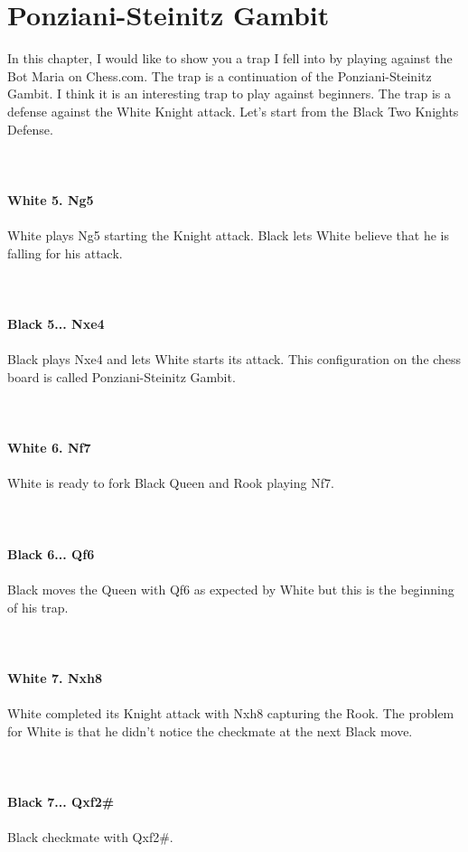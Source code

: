 \documentclass{article}
\begin{document}
\section{ Ponziani-Steinitz Gambit}

In this chapter, I would like to show you a trap I fell into by playing against the Bot Maria on Chess.com. The trap is a continuation of the Ponziani-Steinitz Gambit. I think it is an interesting trap to play against beginners. The trap is a defense against the White Knight attack. Let's start from the Black Two Knights Defense.\\
\\

\\
\\
\textbf{White 5. Ng5}\\
\\
White plays Ng5 starting the Knight attack. Black lets White believe that he is falling for his attack.\\
\\

\\
\\
\textbf{Black 5... Nxe4}\\
\\
Black plays Nxe4 and lets White starts its attack. This configuration on the chess board is called Ponziani-Steinitz Gambit.\\
\\

\\
\\
\textbf{White 6. Nf7}\\
\\
White is ready to fork Black Queen and Rook playing Nf7.\\
\\

\\
\\
\textbf{Black 6... Qf6}\\
\\
Black moves the Queen with Qf6 as expected by White but this is the beginning of his trap.\\
\\

\\
\\
\textbf{White 7. Nxh8}\\
\\
White completed its Knight attack with Nxh8 capturing the Rook. The problem for White is that he didn't notice the checkmate at the next Black move.\\
\\

\\
\\
\textbf{Black 7... Qxf2\#}\\
\\
Black checkmate with Qxf2\#.\\
\\
\end{document}
